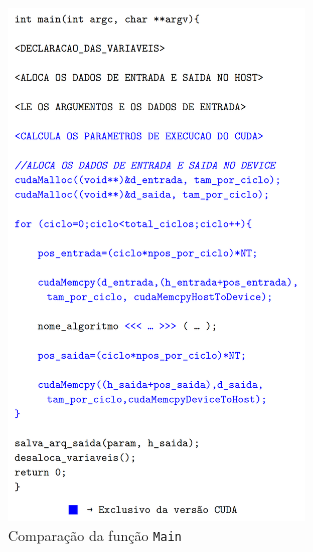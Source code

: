 \begin{figure}[H]
\centering
\includegraphics[width=0.7\textwidth]{Imagens/comparacao_codigo/comparacao_codigo_main.png}
\caption{Comparação da função \texttt{Main}}
\label{fig:comparacao_codigo_main}
\end{figure}
